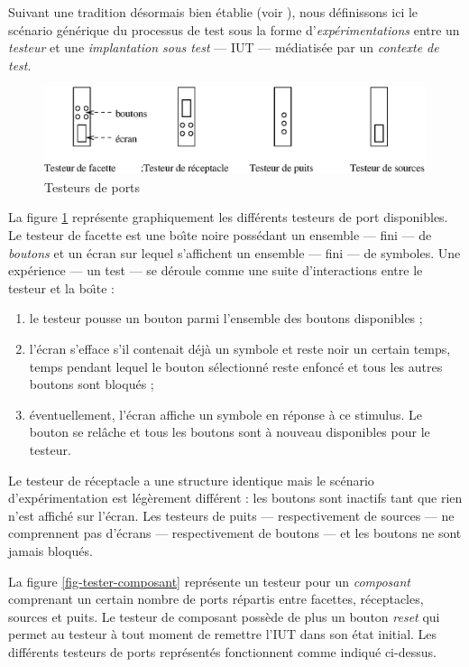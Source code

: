  Suivant une tradition d\'esormais bien \'etablie (voir \cite{sem-seq-proc}), nous d\'efinissons
 ici le sc\'enario g\'en\'erique du processus de test sous la forme
 d'\emph{exp\'erimentations} entre un \emph{testeur} et une
 \emph{implantation sous test} --- \textsf{IUT} --- m\'ediatis\'ee par un \emph{contexte de
 test}. 

 \begin{figure}[htbp]
     \centering
     \includegraphics{figures/port-tester.eps}
     \caption{Testeurs de ports}
     \label{fig-port-tester}
 \end{figure}

 La figure \ref{fig-port-tester}
 repr\'esente graphiquement les diff\'erents testeurs de port
 disponibles. Le testeur de facette est une bo\^{\i}te noire poss\'edant un ensemble --- fini ---
 de \emph{boutons} et un \'ecran sur lequel s'affichent un ensemble
 --- fini --- de symboles. Une exp\'erience --- un test --- se
 d\'eroule comme une suite d'interactions entre le testeur et la
 bo\^{\i}te : 
 \begin{enumerate}
   \item le testeur pousse un bouton parmi l'ensemble des boutons
   disponibles ;
 \item l'\'ecran s'efface s'il contenait d\'ej\`a un symbole et
   reste noir un certain temps, temps pendant lequel le bouton
   s\'electionn\'e reste enfonc\'e et tous les autres boutons sont
   bloqu\'es ;
   \item \'eventuellement, l'\'ecran affiche un symbole en r\'eponse
   \`a ce stimulus. Le bouton se rel\^ache et tous les boutons sont
   \`a nouveau disponibles pour le testeur.
 \end{enumerate}

 Le testeur de r\'eceptacle a une structure identique mais le
 sc\'enario d'exp\'erimentation est l\'eg\`erement diff\'erent :
 les boutons sont inactifs tant que rien n'est affich\'e sur
 l'\'ecran.
 Les testeurs de puits --- respectivement de sources --- ne comprennent
 pas d'\'ecrans --- respectivement de boutons --- et les boutons ne sont
 jamais bloqu\'es.

 La figure \ref{fig-tester-composant} repr\'esente un
 testeur pour un \emph{composant} comprenant un certain nombre de
 ports r\'epartis entre facettes, r\'eceptacles, sources et puits. Le
 testeur de composant poss\`ede de plus un bouton \emph{reset} qui
 permet au testeur \`a tout moment de remettre l'\textsf{IUT} dans son \'etat
 initial. Les diff\'erents testeurs de ports repr\'esent\'es fonctionnent
 comme indiqu\'e ci-dessus.

